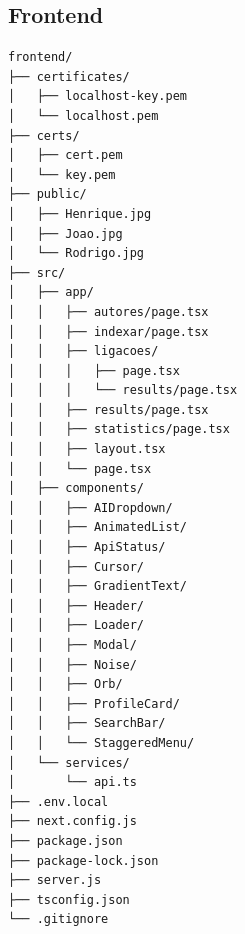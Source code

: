 \documentclass[12pt,a4paper]{article}
\begin{document}
\subsection{Frontend}
\begin{lstlisting}
frontend/
├── certificates/
│   ├── localhost-key.pem
│   └── localhost.pem
├── certs/
│   ├── cert.pem
│   └── key.pem
├── public/
│   ├── Henrique.jpg
│   ├── Joao.jpg
│   └── Rodrigo.jpg
├── src/
│   ├── app/
│   │   ├── autores/page.tsx
│   │   ├── indexar/page.tsx
│   │   ├── ligacoes/
│   │   │   ├── page.tsx
│   │   │   └── results/page.tsx
│   │   ├── results/page.tsx
│   │   ├── statistics/page.tsx
│   │   ├── layout.tsx
│   │   └── page.tsx
│   ├── components/
│   │   ├── AIDropdown/
│   │   ├── AnimatedList/
│   │   ├── ApiStatus/
│   │   ├── Cursor/
│   │   ├── GradientText/
│   │   ├── Header/
│   │   ├── Loader/
│   │   ├── Modal/
│   │   ├── Noise/
│   │   ├── Orb/
│   │   ├── ProfileCard/
│   │   ├── SearchBar/
│   │   └── StaggeredMenu/
│   └── services/
│       └── api.ts
├── .env.local
├── next.config.js
├── package.json
├── package-lock.json
├── server.js
├── tsconfig.json
└── .gitignore
\end{lstlisting}
\end{document}
